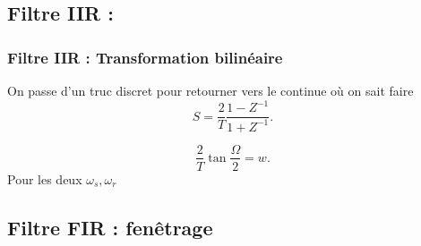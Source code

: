 \documentclass{article}
\theoremstyle{plain}%
\theoremstyle{definition}
\theoremstyle{remark}
\begin{document}
\subsection{Filtre IIR :}
\subsubsection{Filtre IIR : Transformation bilinéaire}
On passe d'un truc discret pour retourner vers le continue où on sait faire 
\[
    S = \frac{2}{T} \frac{1 - Z^{-1}}{1 + Z^{-1}}
    .\]
    
    \[
        \frac{2}{T} \tan \frac{\Omega }{2} = w
        .\]
        Pour les deux $ \omega _s, \omega _r $ 
        
\subsection{Filtre FIR : fenêtrage}
\end{document}
